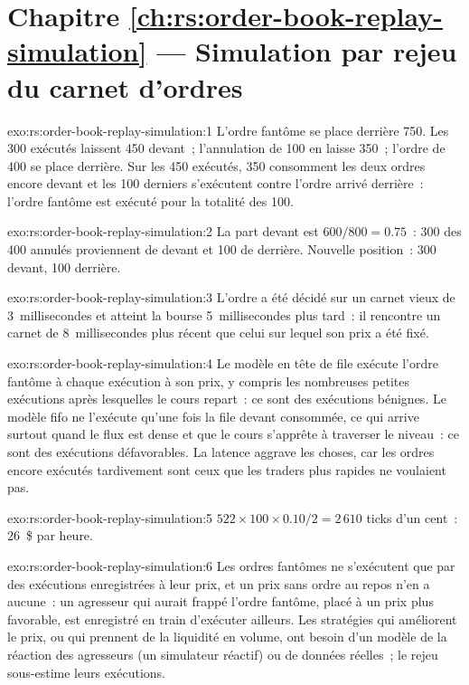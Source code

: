 \section*{Chapitre \ref{ch:rs:order-book-replay-simulation} --- Simulation par rejeu du carnet d'ordres}

\begin{solution}{exo:rs:order-book-replay-simulation:1}
L'ordre fantôme se place derrière 750. Les 300 exécutés laissent 450 devant~; l'annulation de 100 en laisse 350~; l'ordre de 400 se place derrière. Sur les 450 exécutés,
350 consomment les deux ordres encore devant et les 100 derniers s'exécutent contre l'ordre arrivé derrière~: l'ordre fantôme est exécuté pour la totalité des 100.
\end{solution}

\begin{solution}{exo:rs:order-book-replay-simulation:2}
La part devant est $600/800 = 0.75$~: 300 des 400 annulés proviennent de devant et 100 de derrière. Nouvelle position~: 300 devant, 100 derrière.
\end{solution}

\begin{solution}{exo:rs:order-book-replay-simulation:3}
L'ordre a été décidé sur un carnet vieux de 3~millisecondes et atteint la bourse 5~millisecondes plus tard~: il rencontre un carnet de 8~millisecondes plus récent
que celui sur lequel son prix a été fixé.
\end{solution}

\begin{solution}{exo:rs:order-book-replay-simulation:4}
Le modèle en tête de file exécute l'ordre fantôme à chaque exécution à son prix, y compris les nombreuses petites exécutions après lesquelles le cours repart~: ce sont des exécutions bénignes. Le
modèle fifo ne l'exécute qu'une fois la file devant consommée, ce qui arrive surtout quand le flux est dense et que le cours s'apprête
à traverser le niveau~: ce sont des exécutions défavorables. La latence aggrave les choses, car les ordres encore exécutés tardivement sont ceux que les traders plus rapides ne voulaient pas.
\end{solution}

\begin{solution}{exo:rs:order-book-replay-simulation:5}
$522 \times 100 \times 0.10/2 = 2\,610$ ticks d'un cent~: 26~\$ par heure.
\end{solution}

\begin{solution}{exo:rs:order-book-replay-simulation:6}
Les ordres fantômes ne s'exécutent que par des exécutions enregistrées à leur prix, et un prix sans ordre au repos n'en a aucune~: un agresseur qui aurait frappé l'ordre fantôme, placé à un prix plus favorable,
est enregistré en train d'exécuter ailleurs. Les stratégies qui améliorent le prix, ou qui prennent de la liquidité en volume, ont besoin d'un modèle de la réaction des agresseurs (un simulateur réactif)
ou de données réelles~; le rejeu sous-estime leurs exécutions.
\end{solution}

